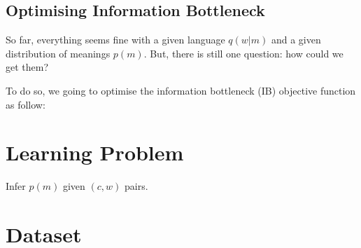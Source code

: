 \documentclass[11pt]{article}
\begin{document}
\subsection{Optimising Information Bottleneck}
\label{ssec:comm_opt_ib}

So far, everything seems fine with a given language $q(w|m)$ and a given distribution of meanings $p(m)$.
But, there is still one question: how could we get them?

To do so, we going to optimise the information bottleneck (IB) objective function as follow:



\section{Learning Problem}
\label{sec:learning}

Infer $p(m)$ given $(c,w)$ pairs.

\section{Dataset}
\label{sec:dataset}




\end{document}
